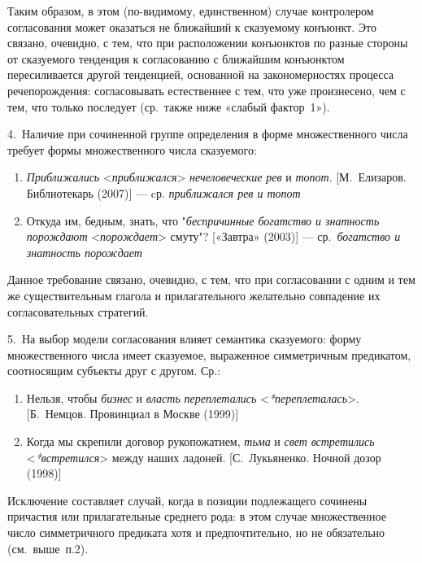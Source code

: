 Таким образом, в этом (по-видимому, единственном) случае контролером
согласования может оказаться не ближайший к сказуемому конъюнкт. Это
связано, очевидно, с тем, что при расположении конъюнктов по разные
стороны от сказуемого тенденция к согласованию с ближайшим конъюнктом
пересиливается другой тенденцией, основанной на закономерностях процесса
речепорождения: согласовывать естественнее с тем, что уже произнесено,
чем с тем, что только последует (ср.~также ниже «слабый фактор~1»).

4.~Наличие при сочиненной группе определения в форме множественного
числа требует формы множественного числа сказуемого:

\begin{enumerate}
\def\labelenumi{(\arabic{enumi})}
\setcounter{enumi}{95}
\item
  \textit{Приближались} \textless*\textit{приближался}\textgreater{}
  \textit{нечеловеческие} \textit{рев} и \textit{топот}. {[}М.~Елизаров.
  Библиотекарь (2007){]} --- cр. \textit{приближался рев и топот}
\item
  Откуда им, бедным, знать, что "\textit{беспричинные богатство и
  знатность порождают} \textless*\textit{порождает}\textgreater{} смуту"?
  {[}«Завтра» (2003){]} --- ср.~\textit{богатство и знатность порождает}
\end{enumerate}

Данное требование связано, очевидно, с тем, что при согласовании с одним
и тем же существительным глагола и прилагательного желательно совпадение
их согласовательных стратегий.

5.~На выбор модели согласования влияет семантика сказуемого: форму
множественного числа имеет сказуемое, выраженное симметричным
предикатом, соотносящим субъекты друг с другом. Ср.:

\begin{enumerate}
\def\labelenumi{(\arabic{enumi})}
\setcounter{enumi}{97}
\item
  Нельзя, чтобы \textit{бизнес} и \textit{власть} \textit{переплетались}
  \textless{}\textit{*переплеталась}\textgreater. {[}Б.~Немцов. Провинциал
  в Москве (1999){]}
\item
  Когда мы скрепили договор рукопожатием, \textit{тьма} и \textit{свет}
  \textit{встретились} \textless{}\textit{*встретился}\textgreater{} между
  наших ладоней. {[}С.~Лукьяненко. Ночной дозор (1998){]}
\end{enumerate}

Исключение составляет случай, когда в позиции подлежащего сочинены
причастия или прилагательные среднего рода: в этом случае множественное
число симметричного предиката хотя и предпочтительно, но не обязательно
(см.~выше~п.2).

